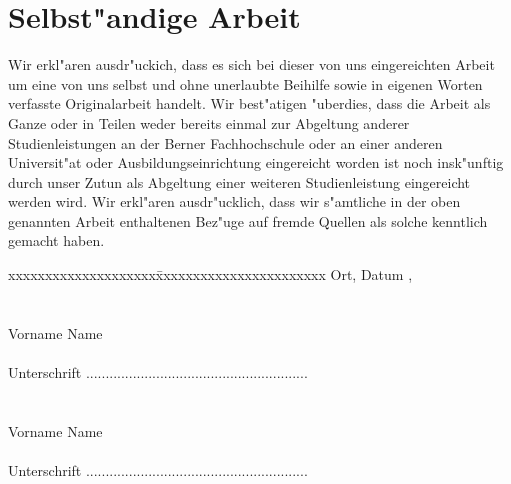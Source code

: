 \chapter*{Selbst"andige Arbeit}
\label{ch:Selbst"andige Arbeit}
Wir erkl"aren ausdr"uckich, dass es sich bei dieser von uns eingereichten Arbeit um eine von uns selbst und ohne unerlaubte Beihilfe sowie in eigenen Worten verfasste Originalarbeit handelt.
Wir best"atigen "uberdies, dass die Arbeit als Ganze oder in Teilen weder bereits einmal zur Abgeltung anderer Studienleistungen an der Berner Fachhochschule oder an einer anderen Universit"at oder Ausbildungseinrichtung eingereicht worden ist noch insk"unftig durch unser Zutun als Abgeltung einer weiteren Studienleistung eingereicht werden wird.
Wir erkl"aren ausdr"ucklich, dass wir s"amtliche in der oben genannten Arbeit enthaltenen Bez"uge auf fremde Quellen als solche kenntlich gemacht haben.
\vspace{2cm}
\begin{tabbing}
xxxxxxxxxxxxxxxxxxxx\=xxxxxxxxxxxxxxxxxxxxxxx \kill
Ort, Datum		\>  \Ort, \Datum \\ \\ \\

Vorname Name	\> \AutorA \\  \\ 
Unterschrift	\> ......................................................... \\ \\  \\ 
Vorname Name	\> \AutorB \\  \\ 
Unterschrift	\> ......................................................... \\ \\  \\ 
\end{tabbing}
